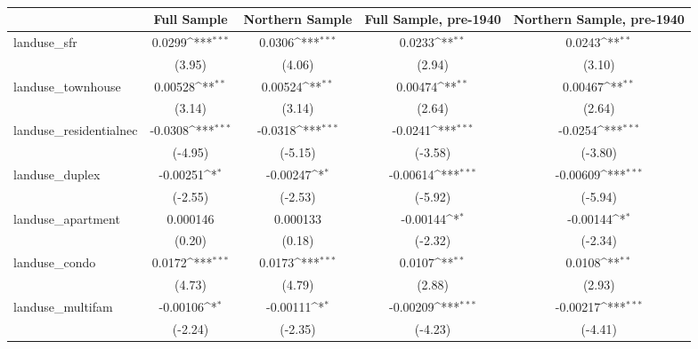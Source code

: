 \begin{table}[htbp]\centering
\def\sym#1{\ifmmode^{#1}\else\(^{#1}\)\fi}
\caption{ \label{tab1}}
\begin{tabular}{l*{4}{c}}
\toprule
                    &\multicolumn{1}{c}{Full Sample}&\multicolumn{1}{c}{Northern Sample}&\multicolumn{1}{c}{Full Sample, pre-1940}&\multicolumn{1}{c}{Northern Sample, pre-1940}\\
\midrule
landuse\_sfr         &      0.0299\sym{***}&      0.0306\sym{***}&      0.0233\sym{**} &      0.0243\sym{**} \\
                    &      (3.95)         &      (4.06)         &      (2.94)         &      (3.10)         \\
\addlinespace
landuse\_townhouse   &     0.00528\sym{**} &     0.00524\sym{**} &     0.00474\sym{**} &     0.00467\sym{**} \\
                    &      (3.14)         &      (3.14)         &      (2.64)         &      (2.64)         \\
\addlinespace
landuse\_residentialnec&     -0.0308\sym{***}&     -0.0318\sym{***}&     -0.0241\sym{***}&     -0.0254\sym{***}\\
                    &     (-4.95)         &     (-5.15)         &     (-3.58)         &     (-3.80)         \\
\addlinespace
landuse\_duplex      &    -0.00251\sym{*}  &    -0.00247\sym{*}  &    -0.00614\sym{***}&    -0.00609\sym{***}\\
                    &     (-2.55)         &     (-2.53)         &     (-5.92)         &     (-5.94)         \\
\addlinespace
landuse\_apartment   &    0.000146         &    0.000133         &    -0.00144\sym{*}  &    -0.00144\sym{*}  \\
                    &      (0.20)         &      (0.18)         &     (-2.32)         &     (-2.34)         \\
\addlinespace
landuse\_condo       &      0.0172\sym{***}&      0.0173\sym{***}&      0.0107\sym{**} &      0.0108\sym{**} \\
                    &      (4.73)         &      (4.79)         &      (2.88)         &      (2.93)         \\
\addlinespace
landuse\_multifam    &    -0.00106\sym{*}  &    -0.00111\sym{*}  &    -0.00209\sym{***}&    -0.00217\sym{***}\\
                    &     (-2.24)         &     (-2.35)         &     (-4.23)         &     (-4.41)         \\

\end{tabular}
\end{table}
